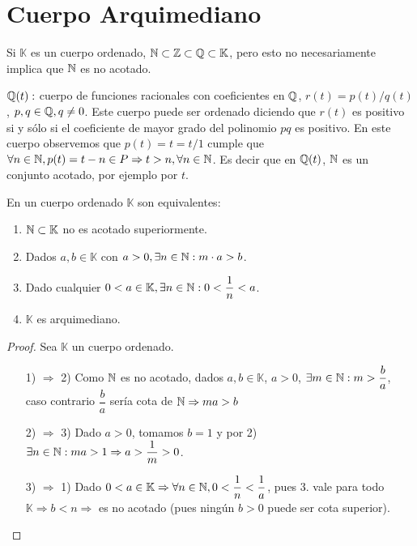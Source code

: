\section{Cuerpo Arquimediano}

Si \(\mathbb{K}\) es un cuerpo ordenado, \(\mathbb{N} \subset \mathbb{Z} \subset \mathbb{Q} \subset \mathbb{K}\), pero esto no necesariamente implica que \(\mathbb{N}\) es no acotado.

\begin{eg}
    \(\mathbb{Q}(t):\) cuerpo de funciones racionales con coeficientes en \(\mathbb{Q}\), \(r(t) = p(t)/q(t)\), \(p, q \in \mathbb{Q}, q \neq 0\). Este cuerpo puede ser ordenado diciendo que \(r(t)\) es positivo si y sólo si el coeficiente de mayor grado del polinomio \(pq\) es positivo.
    En este cuerpo observemos que \(p(t)=t=t/1\) cumple que \(\forall n \in \mathbb{N}, p(t)=t-n \in P \Rightarrow t>n, \forall n \in \mathbb{N}\). Es decir que en \(\mathbb{Q}(t)\), \(\mathbb{N}\) es un conjunto acotado, por ejemplo por \(t\).
\end{eg}

\begin{theorem}
    En un cuerpo ordenado \(\mathbb{K}\) son equivalentes: \begin{enumerate}
        \item \(\mathbb{N} \subset \mathbb{K}\) no es acotado superiormente.
        \item Dados \(a, b \in \mathbb{K}\) con \(a>0, \exists n \in \mathbb{N}:m \cdot a>b\).
        \item Dado cualquier \(0<a \in \mathbb{K}, \exists n \in \mathbb{N} : 0 < \dfrac{1}{n} < a\).
        \item \(\mathbb{K}\) es arquimediano.
    \end{enumerate}
    \begin{proof}
        Sea \(\mathbb{K}\) un cuerpo ordenado. \begin{enumerate}
            \item[1) \(\Rightarrow\) 2)] Como \(\mathbb{N}\) es no acotado, dados \(a,b \in \mathbb{K}\), \(a>0\), \(\exists m \in \mathbb{N} : m > \dfrac ba\), caso contrario \(\dfrac ba\) sería cota de \(\mathbb{N} \Rightarrow ma>b\)
            \item[2) \(\Rightarrow\) 3)] Dado \(a>0\), tomamos \(b=1\) y por 2) \(\exists n \in \mathbb{N} : ma > 1 \Rightarrow a > \dfrac{1}{m} > 0\).
            \item[3) \(\Rightarrow\) 1)] Dado \(0<a \in \mathbb{K} \Rightarrow \forall n \in \mathbb{N}, 0<\dfrac 1n<\dfrac 1a\), pues 3. vale para todo \(\mathbb{K} \Rightarrow b<n \Rightarrow\) es no acotado (pues ningún \(b>0\) puede ser cota superior).
        \end{enumerate}
    \end{proof}
\end{theorem}

